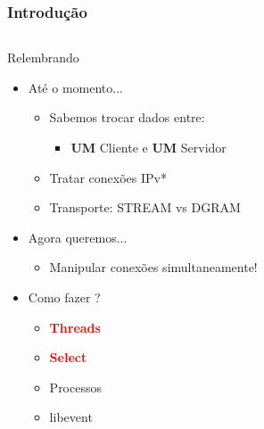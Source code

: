 \documentclass[10pt, xcolor=x11names]{beamer}
\begin{document}
\begin{frame} \frametitle{Introdução}
	
	\begin{columns}
			\begin{block}{Relembrando}	
				\begin{itemize}
					\item<1-> Até o momento...
					\begin{itemize}
						\item Sabemos trocar dados entre:
							\begin{itemize}
							 	\item \textbf{UM} Cliente e \textbf{UM} Servidor
							\end{itemize} 
						\item Tratar conexões IPv*
						\item Transporte: STREAM vs DGRAM
					\end{itemize}
					\item<2->  Agora queremos...
					\begin{itemize}
						\item Manipular conexões simultaneamente!
					\end{itemize}
					\item<3->  Como fazer ?
					\begin{itemize}
						\item \textcolor{red}{\textbf{Threads}}
						\item \textcolor{red}{\textbf{Select}}
						\item Processos
						\item libevent
					\end{itemize}
				\end{itemize}
			\end{block}
			\begin{figure}
			\centering

\end{figure}
\end{columns}
\end{frame}
\end{document}
